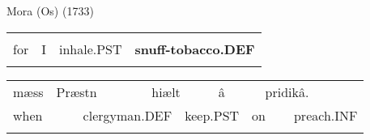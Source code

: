 \begin{listWWNumileveli}
\item {}

\end{listWWNumileveli}

\begin{listWWNumxciiileveli}
\item {}

\begin{styleExLtrTbl}
Mora (Os) (1733)

\end{styleExLtrTbl}

\end{listWWNumxciiileveli}

\begin{styleBodyTextFirst}

\end{styleBodyTextFirst}

\begin{tabular}{llll}
\lsptoprule
\multicolumn{4}{l}{fær

}\\
for & I & inhale.PST & {\bfseries snuff-tobacco.DEF}\\
\lspbottomrule
\end{tabular}

\begin{tabular}{llllllllll}
\lsptoprule
mæss & \multicolumn{2}{l}{Præstn

} & \multicolumn{2}{l}{hiælt

} & \multicolumn{2}{l}{â

} & \multicolumn{2}{l}{pridikâ.

} & \\
\multicolumn{2}{l}{when

} & \multicolumn{2}{l}{clergyman.DEF

} & \multicolumn{2}{l}{keep.PST

} & \multicolumn{2}{l}{on 

} & \multicolumn{2}{l}{preach.INF

}\\
\lspbottomrule
\end{tabular}

\begin{styleExLtrTblii}
\citet{Swedish1733}

\end{styleExLtrTblii}

\begin{styleBodyTextFirst}

\end{styleBodyTextFirst}

